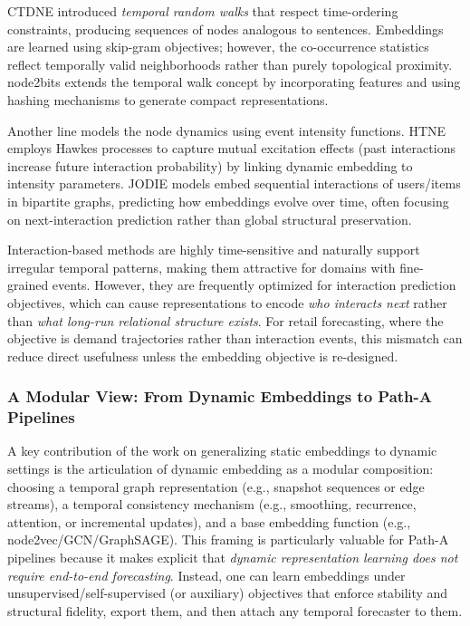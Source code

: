CTDNE \cite{nguyen2018ctdne} introduced \emph{temporal random walks} that respect time-ordering constraints, producing sequences of nodes analogous to sentences. Embeddings are learned using skip-gram objectives; however, the co-occurrence statistics reflect temporally valid neighborhoods rather than purely topological proximity. node2bits extends the temporal walk concept by incorporating features and using hashing mechanisms to generate compact representations.

Another line models the node dynamics using event intensity functions. HTNE\cite{zuo2018htne} employs Hawkes processes to capture mutual excitation effects (past interactions increase future interaction probability) by linking dynamic embedding to intensity parameters. JODIE \cite{kumar2019jodie} models embed sequential interactions of  users/items in bipartite graphs, predicting how embeddings evolve over time, often focusing on next-interaction prediction rather than global structural preservation.


Interaction-based methods are highly time-sensitive and naturally support irregular temporal patterns, making them attractive for domains with fine-grained events. However, they are frequently optimized for interaction prediction objectives, which can cause representations to encode \emph{who interacts next} rather than \emph{what long-run relational structure exists}. For retail forecasting, where the objective is demand trajectories rather than interaction events, this mismatch can reduce direct usefulness unless the embedding objective is re-designed.


\subsubsection{A Modular View: From Dynamic Embeddings to Path-A Pipelines}
\label{ss:dyn-modular}
A key contribution of the work on generalizing static embeddings to dynamic settings is the articulation of dynamic embedding as a modular composition: choosing a temporal graph representation (e.g., snapshot sequences or edge streams), a temporal consistency mechanism (e.g., smoothing, recurrence, attention, or incremental updates), and a base embedding function (e.g., node2vec/GCN/GraphSAGE). This framing is particularly valuable for Path-A pipelines because it makes explicit that \emph{dynamic representation learning does not require end-to-end forecasting}. Instead, one can learn embeddings under unsupervised/self-supervised (or auxiliary) objectives that enforce stability and structural fidelity, export them, and then attach any temporal forecaster to them.

